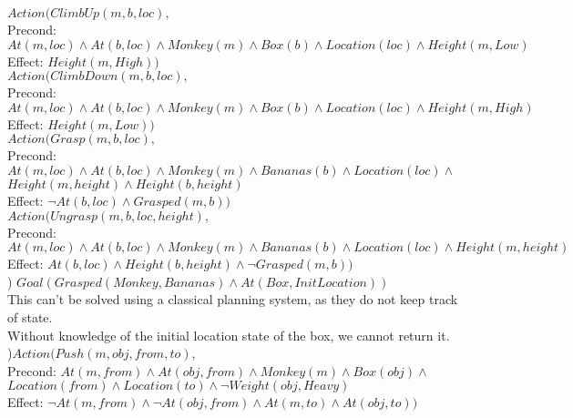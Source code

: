 \documentclass[12pt]{article}
\begin{document}
$Action( ClimbUp(m, b, loc),$\\
\indent Precond: $At(m, loc) \wedge At(b, loc) \wedge Monkey(m) \wedge Box(b) \wedge Location(loc) \wedge Height(m, Low)$\\
\indent Effect: $Height(m, High))$\\

$Action( ClimbDown(m, b, loc),$\\
\indent Precond: $At(m, loc) \wedge At(b, loc) \wedge Monkey(m) \wedge Box(b) \wedge Location(loc) \wedge Height(m, High)$\\
\indent Effect: $Height(m, Low))$\\

$Action( Grasp(m, b, loc),$\\
\indent Precond: $At(m, loc) \wedge At(b, loc) \wedge Monkey(m) \wedge Bananas(b) \wedge Location(loc) \wedge$\\
\indent \indent $ Height(m, height) \wedge Height(b, height)$\\
\indent Effect: $\neg At(b, loc) \wedge Grasped(m, b))$\\

$Action( Ungrasp(m, b, loc, height),$\\
\indent Precond: $At(m, loc) \wedge At(b, loc) \wedge Monkey(m) \wedge Bananas(b) \wedge Location(loc) \wedge Height(m, height)$\\
\indent Effect: $At(b, loc) \wedge Height(b, height) \wedge \neg Grasped(m, b))$\\

) $Goal( Grasped(Monkey, Bananas) \wedge At(Box, InitLocation))$\\
\indent This can't be solved using a classical planning system, as they do not keep track of state.\\
\indent Without knowledge of the initial location state of the box, we cannot return it.\\

)$Action( Push(m, obj, from, to),$\\
\indent Precond: $At(m, from) \wedge At(obj, from) \wedge Monkey(m) \wedge Box(obj) \wedge  $\\
\indent \indent $Location(from) \wedge Location(to) \wedge \neg Weight(obj, Heavy)$\\
\indent Effect: $\neg At(m, from) \wedge \neg At(obj, from) \wedge At(m, to) \wedge At(obj, to) )$\\

\noindent \hrulefill\pagebreak
\end{document}
